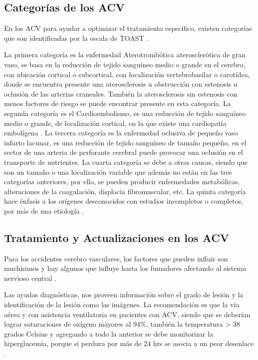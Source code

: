 \doublespacing
\subsection{Categorías de los ACV}
\par En los ACV para ayudar a optimizar el tratamiento específico, existen categorías que son identificadas por la escala de TOAST \cite{Adams1993}.
\par La primera categoría es la enfermedad Aterotrombótica aterosclerótica de gran vaso, se basa en la reducción de tejido sanguíneo medio o grande en el cerebro, con ubicación cortical o subcortical, con localización vertebrobasilar o carotídea, donde se encuentra presente una aterosclerosis u obstrucción con estenosis u oclusión de las arterias craneales. También la aterosclerosis sin estenosis con menos factores de riesgo se puede encontrar presente en esta categoría. La segunda categoría es el Cardioembolismo, es una reducción de tejido sanguíneo medio o grande, de localización cortical, en la que existe una cardiopatía embolígena \cite{Molina2018}. La tercera categoría es la enfermedad oclusiva de pequeño vaso infarto lacunar, es una reducción de tejido sanguíneo de tamaño pequeño, en el sector de una arteria de perforante cerebral puede provocar una oclusión en el transporte de nutrientes. La cuarta categoría se debe a otras causas, siendo que son un tamaño o una localización variable que además no están en las tres categorías anteriores, por ello, se pueden producir enfermedades metabólicas, alteraciones de la coagulación, displacía fibromuscular, etc. La quinta categoría hace énfasis a los orígenes desconocidos con estudios incompletos o completos, por más de una etiología \cite{Radu2017}.\\


\doublespacing
\subsection{Tratamiento y Actualizaciones en los ACV}
\par Para los accidentes cerebro vasculares, los factores que pueden influir son muchísimos y hay algunos que influye hasta los fumadores afectando al sistema nervioso central  \cite{Piloto2020}. 
\par Las ayudas diagnósticas, nos proveen información sobre el grado de lesión y la identificación de la lesión \cite{Wintermark2013} como las imágenes. La recomendación es que la vía aérea y con asistencia ventilatoria en pacientes con ACV, siendo que se deberían lograr saturaciones de oxígeno mayores al 94\%, también la temperatura > 38 grados Celsius y agregando a todo la anterior se debe monitorizar la hiperglucemia, porque si perdura por más de 24 hrs se asocia a un peor desenlace \cite{Garcia2019}.\\